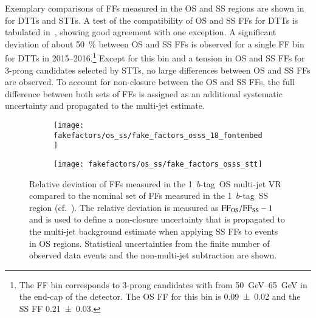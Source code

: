 Exemplary comparisons of FFs measured in the OS and SS regions are shown
in~ for DTTs and STTs. A test of the compatibility of
OS and SS FFs for DTTs is tabulated in~,
showing good agreement with one exception. A significant deviation of about
\SI{50}{\percent} between OS and SS FFs is observed for a single FF bin for DTTs
in 2015--2016.\footnote{The FF bin corresponds to 3-prong \tauhadvis candidates
  with \pT from \SIrange{50}{65}{\GeV} in the end-cap of the detector. The OS FF
  for this bin is \num{0.09 +- 0.02} and the SS FF \num{0.21 +- 0.03}.} Except
for this bin and a tension in OS and SS FFs for 3-prong \tauhadvis candidates
selected by STTs, no large differences between OS and SS FFs are observed.
To account for non-closure between the OS and SS FFs, the full difference
between both sets of FFs is assigned as an additional systematic uncertainty and
propagated to the multi-jet estimate.

\begin{figure}[htbp]
  \centering

  \begin{subfigure}[t]{0.48\textwidth}
    \texttt{[image: fakefactors/os\_ss/fake\_factors\_osss\_18\_fontembed]}
    \label{fig:fake_factor_OSSS_dtt}
  \end{subfigure}\hfill%
  \begin{subfigure}[t]{0.48\textwidth}
    \texttt{[image: fakefactors/os\_ss/fake\_factors\_osss\_stt]}
    \label{fig:fake_factor_OSSS_stt}
  \end{subfigure}

  \caption[Comparison of OS and SS FFs in the \hadhad channel.]{Relative
    deviation of FFs measured in the 1~$b$-tag~OS multi-jet VR compared to the
    nominal set of FFs measured in the 1~$b$-tag~SS region
    (cf.~). The relative
    deviation is measured as $\text{FF}_\text{OS} / \text{FF}_\text{SS} - 1$ and is used to
    define a non-closure uncertainty that is propagated to the multi-jet
    background estimate when applying SS FFs to events in OS
    regions. Statistical uncertainties from the finite number of observed data
    events and the non-multi-jet subtraction are shown.}%
  \label{fig:fake_factor_OSSS}
\end{figure}


